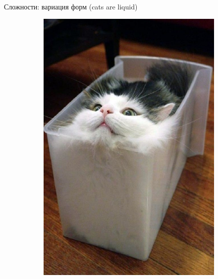 \documentclass[aspectratio=169]{beamer}
\begin{document}
\begin{frame}{Сложности: вариация форм (cats are liquid)}
    \begin{figure}
        \begin{subfigure}[b]{.3\linewidth}
            \includegraphics[width=\linewidth]{graphs/fig10_0.jpg}
        \end{subfigure}
        \begin{subfigure}[b]{.3\linewidth}

\end{subfigure}
\end{figure}
\end{frame}
\end{document}
